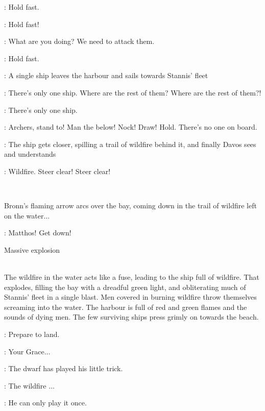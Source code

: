 \TYRION: Hold fast. 

\SERGEANT: Hold fast! 

\JOFFREY: What are you doing? We need to attack them. 

\TYRION: Hold fast. 

\NARRATOR: A single ship leaves the harbour and sails towards Stannis' fleet 

\JOFFREY: There's only one ship. Where are the rest of them? 
Where are the rest of them?! 

\MATTHOS: There's only one ship. 

\DAVOS:  Archers, stand to! 
Man the below! 
Nock! 
Draw! 
Hold. 
 There's no one on board. 

\NARRATOR: The ship gets closer, spilling a trail of wildfire behind it, and finally Davos sees and understands 

\DAVOS: Wildfire. Steer clear! Steer clear! 

\\

\n Bronn's flaming arrow arcs over the bay, coming down in the trail
of wildfire left on the water$\ldots$

\DAVOS: Matthos! Get down! 

\sfx Massive explosion\\
\\

\n The wildfire in the water acts like a fuse, leading to the ship
full of wildfire. That explodes, filling the bay with a dreadful green
light, and obliterating much of Stannis' fleet in a single blast. Men
covered in burning wildfire throw themselves screaming into the
water. The harbour is full of red and green flames and the sounds of
dying men. The few surviving ships press grimly on towards the beach.

\STANNIS: Prepare to land. 

\CAPTAIN: Your Grace$\ldots$ 

\STANNIS: The dwarf has played his little trick. 

\CAPTAIN: The wildfire $\ldots$  

\STANNIS: He can only play it once. 

